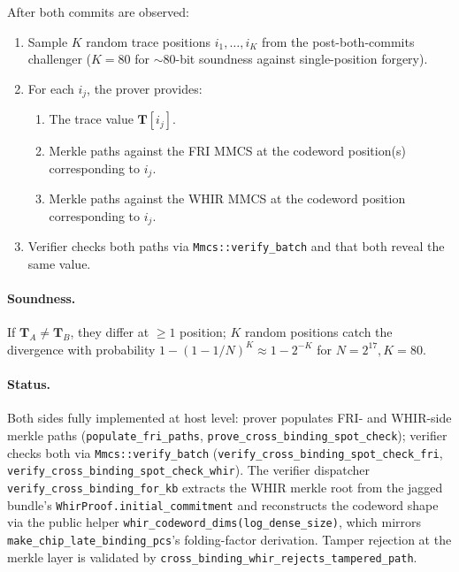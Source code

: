 \begin{construction}
\label{cons:cross-binding}
After both commits are observed:
\begin{enumerate}
  \item Sample $K$ random trace positions $i_1, \ldots, i_K$ from
        the post-both-commits challenger ($K = 80$ for $\sim 80$-bit
        soundness against single-position forgery).
  \item For each $i_j$, the prover provides:
        \begin{enumerate}
          \item The trace value $\mathbf{T}[i_j]$.
          \item Merkle paths against the FRI MMCS at the codeword
                position(s) corresponding to $i_j$.
          \item Merkle paths against the WHIR MMCS at the codeword
                position corresponding to $i_j$.
        \end{enumerate}
  \item Verifier checks both paths via \texttt{Mmcs::verify\_batch}
        and that both reveal the same value.
\end{enumerate}
\end{construction}

\paragraph{Soundness.}  If $\mathbf{T}_A \neq \mathbf{T}_B$, they
differ at $\geq 1$ position; $K$ random positions catch the
divergence with probability $1 - (1 - 1/N)^K \approx 1 - 2^{-K}$
for $N = 2^{17}, K = 80$.

\paragraph{Status.}  Both sides fully implemented at host level:
prover populates FRI- and WHIR-side merkle paths
(\texttt{populate\_fri\_paths},
\texttt{prove\_cross\_binding\_spot\_check}); verifier checks both
via \texttt{Mmcs::verify\_batch}
(\texttt{verify\_cross\_binding\_spot\_check\_fri},
\texttt{verify\_cross\_binding\_spot\_check\_whir}).  The
verifier dispatcher
\texttt{verify\_cross\_binding\_for\_kb} extracts the WHIR merkle
root from the jagged bundle's \texttt{WhirProof.initial\_commitment}
and reconstructs the codeword shape via the public helper
\texttt{whir\_codeword\_dims(log\_dense\_size)}, which mirrors
\texttt{make\_chip\_late\_binding\_pcs}'s folding-factor derivation.
Tamper rejection at the merkle layer is validated by
\texttt{cross\_binding\_whir\_rejects\_tampered\_path}.

